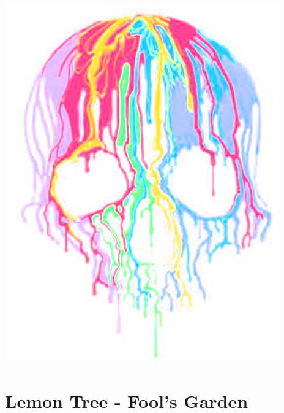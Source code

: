 \documentclass[]{book}
\let\stdsection\section
\renewcommand\section{\clearpage\stdsection}
\begin{document}
\includegraphics{misc/skull.png}

\hypertarget{lemon-tree---fools-garden}{%
\section{Lemon Tree - Fool's Garden}\label{lemon-tree---fools-garden}}
\end{document}
